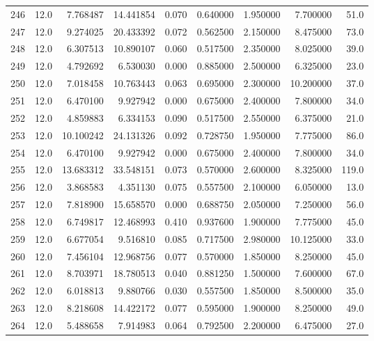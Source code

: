 \begin{tabular}{lrrrrrrrr}
246  &   12.0 &   7.768487 &  14.441854 &  0.070 &  0.640000 &  1.950000 &   7.700000 &   51.0 \\
247  &   12.0 &   9.274025 &  20.433392 &  0.072 &  0.562500 &  2.150000 &   8.475000 &   73.0 \\
248  &   12.0 &   6.307513 &  10.890107 &  0.060 &  0.517500 &  2.350000 &   8.025000 &   39.0 \\
249  &   12.0 &   4.792692 &   6.530030 &  0.000 &  0.885000 &  2.500000 &   6.325000 &   23.0 \\
250  &   12.0 &   7.018458 &  10.763443 &  0.063 &  0.695000 &  2.300000 &  10.200000 &   37.0 \\
251  &   12.0 &   6.470100 &   9.927942 &  0.000 &  0.675000 &  2.400000 &   7.800000 &   34.0 \\
252  &   12.0 &   4.859883 &   6.334153 &  0.090 &  0.517500 &  2.550000 &   6.375000 &   21.0 \\
253  &   12.0 &  10.100242 &  24.131326 &  0.092 &  0.728750 &  1.950000 &   7.775000 &   86.0 \\
254  &   12.0 &   6.470100 &   9.927942 &  0.000 &  0.675000 &  2.400000 &   7.800000 &   34.0 \\
255  &   12.0 &  13.683312 &  33.548151 &  0.073 &  0.570000 &  2.600000 &   8.325000 &  119.0 \\
256  &   12.0 &   3.868583 &   4.351130 &  0.075 &  0.557500 &  2.100000 &   6.050000 &   13.0 \\
257  &   12.0 &   7.818900 &  15.658570 &  0.000 &  0.688750 &  2.050000 &   7.250000 &   56.0 \\
258  &   12.0 &   6.749817 &  12.468993 &  0.410 &  0.937600 &  1.900000 &   7.775000 &   45.0 \\
259  &   12.0 &   6.677054 &   9.516810 &  0.085 &  0.717500 &  2.980000 &  10.125000 &   33.0 \\
260  &   12.0 &   7.456104 &  12.968756 &  0.077 &  0.570000 &  1.850000 &   8.250000 &   45.0 \\
261  &   12.0 &   8.703971 &  18.780513 &  0.040 &  0.881250 &  1.500000 &   7.600000 &   67.0 \\
262  &   12.0 &   6.018813 &   9.880766 &  0.030 &  0.557500 &  1.850000 &   8.500000 &   35.0 \\
263  &   12.0 &   8.218608 &  14.422172 &  0.077 &  0.595000 &  1.900000 &   8.250000 &   49.0 \\
264  &   12.0 &   5.488658 &   7.914983 &  0.064 &  0.792500 &  2.200000 &   6.475000 &   27.0 \\

\end{tabular}
